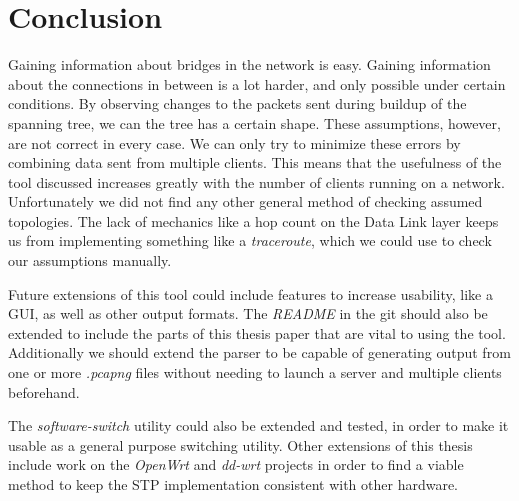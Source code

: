 \chapter{Conclusion}
Gaining information about bridges in the network is easy.
Gaining information about the connections in between is a lot harder, and only possible under certain conditions.
By observing changes to the packets sent during buildup of the spanning tree, we can the tree has a certain shape.
These assumptions, however, are not correct in every case.
We can only try to minimize these errors by combining data sent from multiple clients.
This means that the usefulness of the tool discussed increases greatly with the number of clients running on a network.
Unfortunately we did not find any other general method of checking assumed topologies.
The lack of mechanics like a hop count on the Data Link layer keeps us from implementing something like a \textit{traceroute}, which we could use to check our assumptions manually.

Future extensions of this tool could include features to increase usability, like a GUI, as well as other output formats.
The \textit{README} in the git should also be extended to include the parts of this thesis paper that are vital to using the tool.
Additionally we should extend the parser to be capable of generating output from one or more \textit{.pcapng} files without needing to launch a server and multiple clients beforehand.
\newline

The \textit{software-switch} utility could also be extended and tested, in order to make it usable as a general purpose switching utility.
Other extensions of this thesis include work on the \textit{OpenWrt} and \textit{dd-wrt} projects in order to find a viable method to keep the STP implementation consistent with other hardware.
